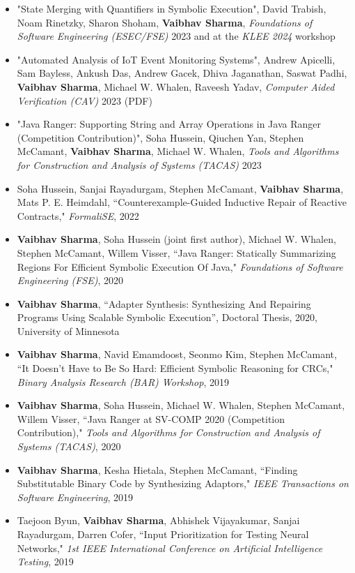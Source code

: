 \documentclass[letterpaper,10pt]{article}
\newlength{\outerbordwidth}
\newcommand{\resheading}[1]{\vspace{-8pt}
  \parbox{\textwidth}{\setlength{\FrameSep}{\outerbordwidth}
    \begin{shaded}
\setlength{\fboxsep}{0pt}\framebox[\textwidth][l]{\setlength{\fboxsep}{4pt}\fcolorbox{shadecolorB}{shadecolorB}{\textbf{\sffamily{\mbox{~}\makebox[6.762in][l]{\large #1} \vphantom{p\^{E}}}}}}
    \end{shaded}
  }\vspace{-5pt}
}
\begin{document}
%
\resheading{Publications}
\vspace{-8pt}
\begin{itemize}
	\item
		"State Merging with Quantifiers in Symbolic Execution", David Trabish, Noam Rinetzky, Sharon Shoham, {\bf Vaibhav Sharma}, \textit{Foundations of Software Engineering (ESEC/FSE)} 2023 and at the \textit{KLEE 2024} workshop
	\item
		"Automated Analysis of IoT Event Monitoring Systems", Andrew Apicelli, Sam Bayless, Ankush Das, Andrew Gacek, Dhiva Jaganathan, Saswat Padhi, {\bf Vaibhav Sharma}, Michael W. Whalen, Raveesh Yadav, \textit{Computer Aided Verification (CAV)} 2023  (PDF)
	\item
  "Java Ranger: Supporting String and Array Operations in Java Ranger (Competition Contribution)", Soha Hussein, Qiuchen Yan, Stephen McCamant, {\bf Vaibhav Sharma}, Michael W. Whalen, \textit{Tools and Algorithms for Construction and Analysis of Systems (TACAS)} 2023
\item
  Soha Hussein, Sanjai Rayadurgam, Stephen McCamant, {\bf Vaibhav Sharma}, Mats P. E. Heimdahl, ``Counterexample-Guided Inductive Repair of Reactive Contracts," \textit{FormaliSE}, 2022
  \item
{\bf Vaibhav Sharma}, Soha Hussein (joint first author), Michael W. Whalen, Stephen McCamant, Willem Visser, ``Java Ranger: Statically Summarizing Regions For Efficient Symbolic Execution Of Java," \textit{Foundations of Software Engineering (FSE)}, 2020
\item
  {\bf Vaibhav Sharma}, ``Adapter Synthesis: Synthesizing And Repairing Programs Using Scalable Symbolic Execution'', Doctoral Thesis, 2020, University of Minnesota
\item
  {\bf Vaibhav Sharma}, Navid Emamdoost, Seonmo Kim, Stephen McCamant, ``It Doesn't Have to Be So Hard: Efficient Symbolic Reasoning for CRCs," \textit{Binary Analysis Research (BAR) Workshop}, 2019
\item
  {\bf Vaibhav Sharma}, Soha Hussein, Michael W. Whalen, Stephen McCamant, Willem Visser, ``Java Ranger at SV-COMP 2020 (Competition Contribution)," \textit{Tools and Algorithms for Construction and Analysis of Systems (TACAS)}, 2020
\item
  {\bf Vaibhav Sharma}, Kesha Hietala, Stephen McCamant, ``Finding Substitutable Binary Code by Synthesizing Adaptors," \textit{IEEE Transactions on Software Engineering}, 2019
\item
  Taejoon Byun, {\bf Vaibhav Sharma}, Abhishek Vijayakumar, Sanjai Rayadurgam, Darren Cofer, ``Input Prioritization for Testing Neural Networks," \textit{1st IEEE International Conference on Artificial Intelligence Testing}, 2019

\end{itemize}
\end{document}
